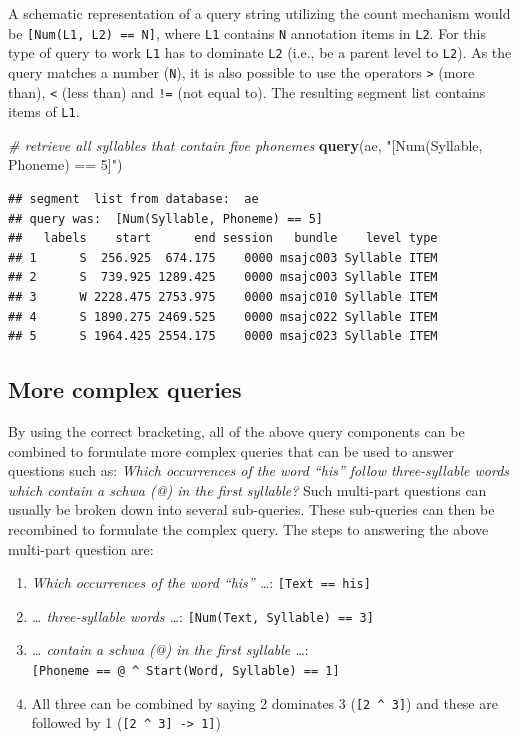\documentclass[]{book}
\newenvironment{Shaded}{\begin{snugshade}}{\end{snugshade}}
\newcommand{\CommentTok}[1]{\textcolor[rgb]{0.56,0.35,0.01}{\textit{#1}}}
\newcommand{\KeywordTok}[1]{\textcolor[rgb]{0.13,0.29,0.53}{\textbf{#1}}}
\newcommand{\NormalTok}[1]{#1}
\newcommand{\StringTok}[1]{\textcolor[rgb]{0.31,0.60,0.02}{#1}}
\providecommand{\tightlist}{%
  \setlength{\itemsep}{0pt}\setlength{\parskip}{0pt}}
\theoremstyle{definition}
\theoremstyle{definition}
\theoremstyle{definition}
\theoremstyle{remark}
\begin{document}
A schematic representation of a query string utilizing the count
mechanism would be \texttt{{[}Num(L1,\ L2)\ ==\ N{]}}, where \texttt{L1}
contains \texttt{N} annotation items in \texttt{L2}. For this type of
query to work \texttt{L1} has to dominate \texttt{L2} (i.e., be a parent
level to \texttt{L2}). As the query matches a number (\texttt{N}), it is
also possible to use the operators \texttt{\textgreater{}} (more than),
\texttt{\textless{}} (less than) and \texttt{!=} (not equal to). The
resulting segment list contains items of \texttt{L1}.

\begin{Shaded}
\begin{Highlighting}[]
\CommentTok{# retrieve all syllables that contain five phonemes}
\KeywordTok{query}\NormalTok{(ae, }\StringTok{"[Num(Syllable, Phoneme) == 5]"}\NormalTok{)}
\end{Highlighting}
\end{Shaded}

\begin{verbatim}
## segment  list from database:  ae 
## query was:  [Num(Syllable, Phoneme) == 5] 
##   labels    start      end session   bundle    level type
## 1      S  256.925  674.175    0000 msajc003 Syllable ITEM
## 2      S  739.925 1289.425    0000 msajc003 Syllable ITEM
## 3      W 2228.475 2753.975    0000 msajc010 Syllable ITEM
## 4      S 1890.275 2469.525    0000 msajc022 Syllable ITEM
## 5      S 1964.425 2554.175    0000 msajc023 Syllable ITEM
\end{verbatim}

\hypertarget{subsec:query_moreComplexQueries}{%
\subsection{More complex
queries}\label{subsec:query_moreComplexQueries}}

By using the correct bracketing, all of the above query components can
be combined to formulate more complex queries that can be used to answer
questions such as: \emph{Which occurrences of the word ``his'' follow
three-syllable words which contain a schwa (@) in the first syllable?}
Such multi-part questions can usually be broken down into several
sub-queries. These sub-queries can then be recombined to formulate the
complex query. The steps to answering the above multi-part question are:

\begin{enumerate}
\def\labelenumi{\arabic{enumi}.}
\tightlist
\item
  \emph{Which occurrences of the word ``his'' \ldots{}}:
  \texttt{{[}Text\ ==\ his{]}}
\item
  \emph{\ldots{} three-syllable words \ldots{}}:
  \texttt{{[}Num(Text,\ Syllable)\ ==\ 3{]}}
\item
  \emph{\ldots{} contain a schwa (@) in the first syllable \ldots{}}:
  \texttt{{[}Phoneme\ ==\ @\ \^{}\ Start(Word,\ Syllable)\ ==\ 1{]}}
\item
  All three can be combined by saying 2 dominates 3
  (\texttt{{[}2\ \^{}\ 3{]}}) and these are followed by 1
  (\texttt{{[}2\ \^{}\ 3{]}\ -\textgreater{}\ 1{]}})
\end{enumerate}
\end{document}
